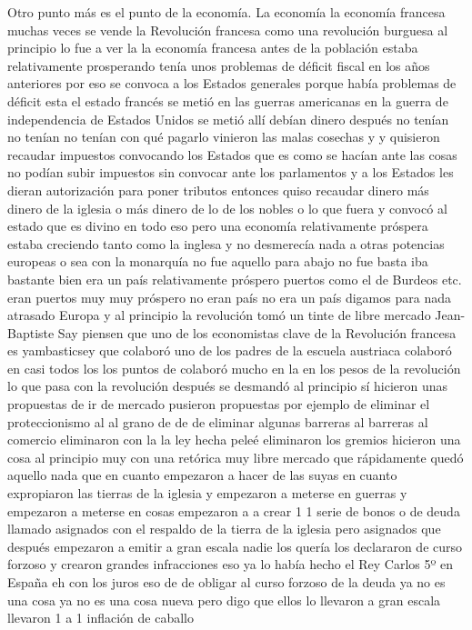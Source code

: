 Otro punto más es el punto de la economía. La economía la economía francesa muchas veces se vende la Revolución francesa como una revolución burguesa al principio lo fue a ver la la economía francesa antes de la población
estaba relativamente prosperando tenía unos problemas de déficit fiscal en los años anteriores por eso se convoca a los Estados generales
porque había problemas de déficit esta el estado francés se metió en las guerras americanas en la guerra de independencia de Estados Unidos
se metió allí debían dinero después no tenían no tenían no tenían con qué pagarlo vinieron las malas cosechas y
y quisieron recaudar impuestos convocando los Estados que es como se hacían ante las cosas no podían subir impuestos
sin convocar ante los parlamentos y a los Estados les dieran autorización para poner tributos
entonces quiso recaudar dinero más dinero de la iglesia o más dinero de lo de los nobles o lo que fuera y convocó al estado que es divino en todo eso
pero una economía relativamente próspera estaba creciendo tanto como la inglesa y no desmerecía nada a otras potencias europeas
o sea con la monarquía no fue aquello para abajo no fue basta iba bastante bien
era un país relativamente próspero puertos como el de Burdeos etc. eran puertos muy muy próspero no eran país
no era un país digamos para nada atrasado Europa y al principio la revolución tomó un tinte de libre mercado
Jean-Baptiste Say
piensen que uno de los economistas clave de la Revolución francesa es yambasticsey que colaboró uno de los padres de la escuela austriaca
colaboró en casi todos los los puntos de colaboró mucho en la en los pesos de la revolución lo que pasa con la revolución después se desmandó
al principio sí hicieron unas propuestas de ir de mercado pusieron propuestas por ejemplo de eliminar
el proteccionismo al al grano de de de eliminar algunas barreras al barreras al comercio
eliminaron con la la ley hecha peleé eliminaron los gremios hicieron una cosa al principio muy con una retórica
muy libre mercado que rápidamente quedó aquello nada que en cuanto empezaron a hacer de las suyas en cuanto expropiaron las tierras de la iglesia
y empezaron a meterse en guerras y empezaron a meterse en cosas empezaron a a crear 1 1 serie de bonos o de deuda
llamado asignados con el respaldo de la tierra de la iglesia pero asignados que después
empezaron a emitir a gran escala nadie los quería los declararon de curso forzoso y crearon grandes infracciones
eso ya lo había hecho el Rey Carlos 5º en España eh con los juros eso de de obligar al curso forzoso de la deuda
ya no es una cosa ya no es una cosa nueva pero digo que ellos lo llevaron a gran escala llevaron 1 a 1 inflación de caballo
